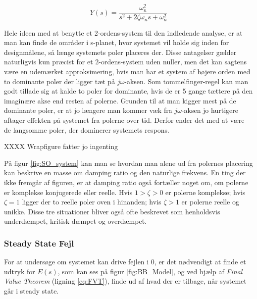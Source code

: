 \begin{equation}\label{eq:SO_system}
Y(s)=\frac{\omega_{n}^2}{s^2+2\zeta\omega_{n}s+\omega_{n}^2}
\end{equation}

Hele ideen med at benytte et 2-ordens-system til den indledende analyse, er at man kan finde de områder i s-planet, hvor systemet vil holde sig inden for designmålene, så længe systemets poler placeres der. Disse antagelser gælder naturligvis kun præcist for et 2-ordens-system uden nuller, men det kan sagtens være en udemærket approksimering, hvis man har et system af højere orden med to dominante poler der ligger tæt på $j\omega$-aksen. Som tommelfinger-regel kan man godt tillade sig at kalde to poler for dominante, hvis de er 5 gange tættere på den imaginære akse end resten af polerne. Grunden til at man kigger mest på de dominante poler, er at jo længere man kommer væk fra $j\omega$-aksen jo hurtigere aftager effekten på systemet fra polerne over tid. Derfor ender det med at være de langsomme poler, der dominerer systemets respons.

XXXX Wrapfigure fatter jo ingenting

På figur \ref{fig:SO_system} kan man se hvordan man alene ud fra polernes placering kan beskrive en masse om damping ratio og den naturlige frekvens. En ting der ikke fremgår af figuren, er at damping ratio også fortæller noget om, om polerne er komplekse konjugerede eller reelle. Hvis $1>\zeta>0$ er polerne komplekse; hvis $\zeta=1$ ligger der to reelle poler oven i hinanden; hvis $\zeta>1$ er polerne reelle og unikke. Disse tre situationer bliver også ofte beskrevet som henholdsvis underdæmpet, kritisk dæmpet og overdæmpet.




\subsubsection{Steady State Fejl}

For at undersøge om systemet kan drive fejlen i 0, er det nødvendigt at finde et udtryk for $E(s)$, som kan ses på figur \ref{fig:BB_Model}, og ved hjælp af \textit{Final Value Theorem} (ligning \ref{eq:FVT}), finde ud af hvad der er tilbage, når systemet går i steady state. 

